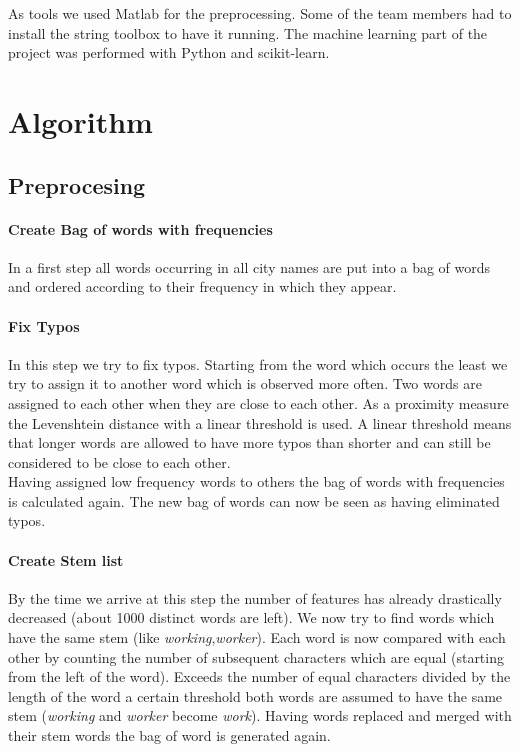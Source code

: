 \documentclass[a4paper, 11pt]{article}
\begin{document}
As tools we used Matlab for the preprocessing. Some of the team members had to install the string toolbox to have it running. The machine learning part of the project was performed with Python and scikit-learn.


\section{Algorithm}


\subsection{Preprocesing}
\label{subsec:preproc}


\paragraph{Create Bag of words with frequencies}

In a first step all words occurring in all city names are put into a bag of words and ordered according to their frequency in which they appear.

\paragraph{Fix Typos}
In this step we try to fix typos. Starting from the word which occurs the least we try to assign it to another word which is observed more often. Two words are assigned to each other when they are close to each other. As a proximity measure the Levenshtein distance with a linear threshold is used. A linear threshold means that longer words are allowed to have more typos than shorter and can still be considered to be close to each other.\\

Having assigned low frequency words to others the bag of words with frequencies is calculated again. The new bag of words can now be seen as having eliminated typos.

\paragraph{Create Stem list}
By the time we arrive at this step the number of features has already drastically decreased (about 1000 distinct words are left). We now try to find words which have the same stem (like \textit{working},\textit{worker}). Each word is now compared with each other by counting the number of subsequent characters which are equal (starting from the left of the word). Exceeds the number of equal characters divided by the length of the word a certain threshold both words are assumed to have the same stem (\textit{working} and \textit{worker} become \textit{work}). Having words replaced and merged with their stem words the bag of word is generated again.
\end{document}
